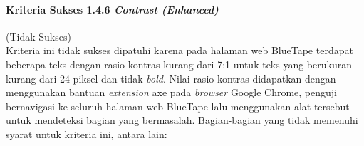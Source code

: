 \paragraph{Kriteria Sukses 1.4.6 \textit{Contrast (Enhanced)}}
\label{par:kepatuhan_bluetape_kriteria_sukses_1.4.6}
(Tidak Sukses)\\

Kriteria ini tidak sukses dipatuhi karena pada halaman web BlueTape terdapat beberapa teks dengan rasio kontras kurang dari 7:1 untuk teks yang berukuran kurang dari 24 piksel dan tidak \textit{bold}. Nilai rasio kontras didapatkan dengan menggunakan bantuan \textit{extension} axe pada \textit{browser} Google Chrome, penguji bernavigasi ke seluruh halaman web BlueTape lalu menggunakan alat tersebut untuk mendeteksi bagian yang bermasalah. Bagian-bagian yang tidak memenuhi syarat untuk kriteria ini, antara lain:

